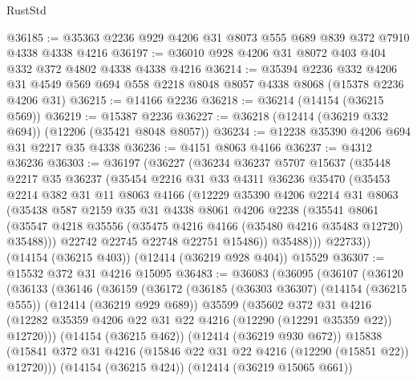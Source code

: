 \begin{lexlean}{RustStd}
\begin{coremodule}
{\begin{coremodule}
{{{{{{{{{{{{{{{{{{{{{{{{{{{{{{{{{{{{{{{{{{{{{{{{{{@36185 := @35363 @2236 @929 @4206 @31 @8073 @555 @689 @839 @372 @7910 @4338 @4338 @4216
@36197 := @36010 @928 @4206 @31 @8072 @403 @404 @332 @372 @4802 @4338 @4338 @4216
@36214 := @35394
    @2236
    @332
    @4206
    @31
    @4549
    @569
    @694
    @558
    @2218
    @8048
    @8057
    @4338
    @8068
    (@15378 @2236 @4206 @31)
@36215 := @14166 @2236
@36218 := @36214 (@14154 (@36215 @569))
@36219 := @15387 @2236
@36227 := @36218 (@12414 (@36219 @332 @694)) (@12206 (@35421 @8048 @8057))
@36234 := @12238 @35390 @4206 @694 @31 @2217 @35 @4338
@36236 := @4151 @8063 @4166
@36237 := @4312 @36236
@36303 := @36197
    (@36227
      (@36234
        @36237
        @5707
        @15637
        (@35448
          @2217
          @35
          @36237
          (@35454
            @2216
            @31
            @33
            @4311
            @36236
            @35470
            (@35453
              @2214
              @382
              @31
              @11
              @8063
              @4166
              (@12229
                @35390
                @4206
                @2214
                @31
                @8063
                (@35438
                  @587
                  @2159
                  @35
                  @31
                  @4338
                  @8061
                  @4206
                  @2238
                  (@35541
                    @8061
                    (@35547 @4218 @35556 (@35475 @4216 @4166 (@35480 @4216 @35483 @12720) @35488)))
                  @22742
                  @22745
                  @22748
                  @22751
                  @15486))
              @35488)))
        @22733))
    (@14154 (@36215 @403))
    (@12414 (@36219 @928 @404))
    @15529
@36307 := @15532 @372 @31 @4216 @15095
@36483 := @36083
    (@36095
      (@36107
        (@36120
          (@36133
            (@36146
              (@36159
                (@36172
                  (@36185
                    (@36303 @36307)
                    (@14154 (@36215 @555))
                    (@12414 (@36219 @929 @689))
                    @35599
                    (@35602
                      @372
                      @31
                      @4216
                      (@12282 @35359 @4206 @22 @31 @22 @4216 (@12290 (@12291 @35359 @22)) @12720)))
                  (@14154 (@36215 @462))
                  (@12414 (@36219 @930 @672))
                  @15838
                  (@15841 @372 @31 @4216 (@15846 @22 @31 @22 @4216 (@12290 (@15851 @22)) @12720)))
                (@14154 (@36215 @424))
                (@12414 (@36219 @15065 @661))
}}}}}}}}}}}}}}}}}}}}}}}}}}}}}}}}}}}}}}}}}}}}}}}}}}
\end{coremodule}}
\end{coremodule}
\end{lexlean}
